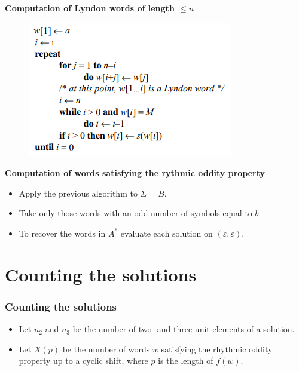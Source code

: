 \documentclass{beamer}
\theoremstyle{definition}
\begin{document}
\begin{frame}

\textbf{Computation of Lyndon words of length $\leq n$}

\begin{figure}
\includegraphics[scale=0.8]{algoritmo}
\end{figure}

\end{frame}

\begin{frame}
\textbf{Computation of words satisfying the rythmic oddity property}
\begin{itemize}
\item<2-> Apply the previous algorithm to $\Sigma=B$.
\item<3-> Take only those words with an odd number of symbols equal to $b$. 
\item<4-> To recover the words in $A^*$ evaluate each solution on $(\varepsilon,\varepsilon)$. 
\end{itemize}
\end{frame}
\section{Counting the solutions}



\begin{frame}
\frametitle{Counting the solutions}
\begin{itemize}


\item
 Let $n_2$ and $n_3$ be the number of two- and three-unit
elements of a solution. 

\item<2->Let $X(p)$ be the number of words $w$ satisfying the
rhythmic oddity property up to a cyclic shift, where $p$
is the length of $f (w)$.
\end{itemize}

\end{frame}
\end{document}

